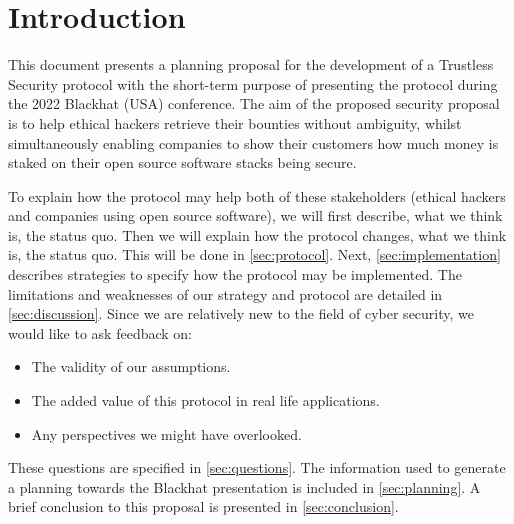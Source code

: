 \section{Introduction}
\label{sec:introduction}
This document presents a planning proposal for the development of a Trustless Security protocol with the short-term purpose of presenting the protocol during the 2022 Blackhat (USA) conference. The aim of the proposed security proposal is to help ethical hackers retrieve their bounties without ambiguity, whilst simultaneously enabling companies to show their customers how much money is staked on their open source software stacks being secure.

To explain how the protocol may help both of these stakeholders (ethical hackers and companies using open source software), we will first describe, what we think is, the status quo. Then we will explain how the protocol changes, what we think is, the status quo. This will be done in \cref{sec:protocol}. Next, \cref{sec:implementation} describes strategies to specify how the protocol may be implemented. The limitations and weaknesses of our strategy and protocol are detailed in \cref{sec:discussion}. Since we are relatively new to the field of cyber security, we would like to ask feedback on:
\begin{itemize}
	\item The validity of our assumptions.
	\item The added value of this protocol in real life applications.
	\item Any perspectives we might have overlooked.
\end{itemize}
These questions are specified in \cref{sec:questions}. The information used to generate a planning towards the Blackhat presentation is included in \cref{sec:planning}. A brief conclusion to this proposal is presented in \cref{sec:conclusion}.